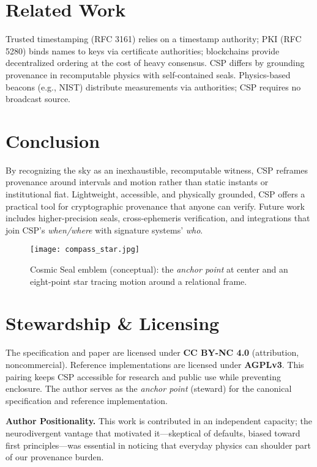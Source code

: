 \documentclass[11pt]{article}
\begin{document}
\section{Related Work}
Trusted timestamping (RFC 3161) relies on a timestamp authority; PKI (RFC 5280) binds names to keys via certificate authorities; blockchains provide decentralized ordering at the cost of heavy consensus. CSP differs by grounding provenance in recomputable physics with self-contained seals. Physics-based beacons (e.g., NIST) distribute measurements via authorities; CSP requires no broadcast source.

\section{Conclusion}
By recognizing the sky as an inexhaustible, recomputable witness, CSP reframes provenance around intervals and motion rather than static instants or institutional fiat. Lightweight, accessible, and physically grounded, CSP offers a practical tool for cryptographic provenance that anyone can verify. Future work includes higher-precision seals, cross-ephemeris verification, and integrations that join CSP's \emph{when/where} with signature systems' \emph{who}.

\begin{figure}[t]
  \centering
  \texttt{[image: compass\_star.jpg]}
  \caption{Cosmic Seal emblem (conceptual): the \emph{anchor point} at center and an eight-point star tracing motion around a relational frame.}
  \label{fig:emblem}
\end{figure}

\section*{Stewardship \& Licensing}
The specification and paper are licensed under \textbf{CC BY-NC 4.0} (attribution, noncommercial). Reference implementations are licensed under \textbf{AGPLv3}. This pairing keeps CSP accessible for research and public use while preventing enclosure. The author serves as the \emph{anchor point} (steward) for the canonical specification and reference implementation.

\vspace{0.5em}
\noindent\textbf{Author Positionality.} This work is contributed in an independent capacity; the neurodivergent vantage that motivated it---skeptical of defaults, biased toward first principles---was essential in noticing that everyday physics can shoulder part of our provenance burden.
\end{document}
